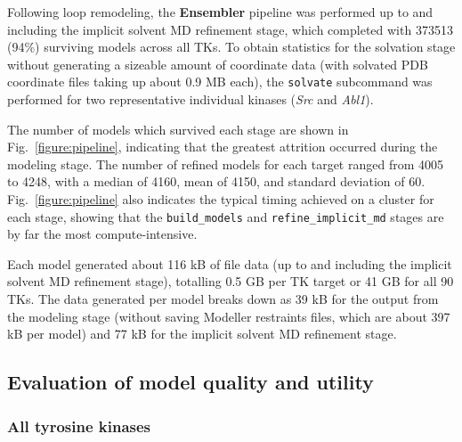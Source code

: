 \documentclass[aps,pre,twocolumn,nofootinbib,superscriptaddress,linenumbers]{revtex4-1}
\begin{document}
Following loop remodeling, the {\bf Ensembler} pipeline was performed up to and including the implicit solvent MD refinement stage, which completed with \num{373513} (94\%) surviving models across all TKs.
To obtain statistics for the solvation stage without generating a sizeable amount of coordinate data (with solvated PDB coordinate files taking up about 0.9 MB each), the {\tt solvate} subcommand was performed for two representative individual kinases (\emph{Src} and \emph{Abl1}).

The number of models which survived each stage are shown in Fig.~\ref{figure:pipeline}, indicating that the greatest attrition occurred during the modeling stage.
The number of refined models for each target ranged from \num{4005} to \num{4248}, with a median of \num{4160}, mean of \num{4150}, and standard deviation of \num{60}.
Fig.~\ref{figure:pipeline} also indicates the typical timing achieved on a cluster for each stage, showing that the {\tt build\_models} and {\tt refine\_implicit\_md} stages are by far the most compute-intensive.

Each model generated about 116 kB of file data (up to and including the implicit solvent MD refinement stage), totalling 0.5 GB per TK target or 41 GB for all 90 TKs.
The data generated per model breaks down as 39 kB for the output from the modeling stage (without saving Modeller restraints files, which are about 397 kB per model) and 77 kB for the implicit solvent MD refinement stage.

\subsection*{Evaluation of model quality and utility}

\subsubsection*{All tyrosine kinases}


\end{document}
